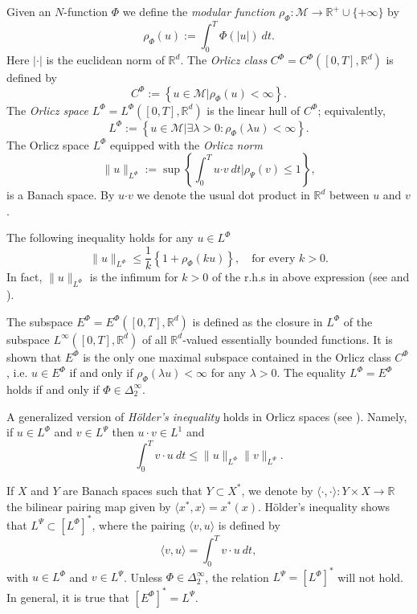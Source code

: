 \documentclass[twoside]{article}
\theoremstyle{remark}
\newcommand{\orlnor}{\|_{L^{\Phi}}}
\newcommand{\lphi}{L^{\Phi}}
\newcommand{\lpsi}{L^{\Psi}}
\newcommand{\ephi}{E^{\Phi}}
\newcommand{\claseor}{C^{\Phi}}
\renewcommand{\b}[1]{\boldsymbol{#1}}
\newcommand{\rr}{\mathbb{R}}
\renewcommand{\leq}{\leqslant}
\begin{document}
Given  an $N$-function $\Phi$ we define the \emph{modular function} 
$\rho_{\Phi}:\mathcal{M}\to \mathbb{R}^+\cup\{+\infty\}$ by
\[\rho_{\Phi}(u):= \int_0^T \Phi(|u|)\ dt.\]
Here $|\cdot|$ is the euclidean norm of $\mathbb{R}^d$.
The \emph{Orlicz class} $C^{\Phi}=C^{\Phi}([0,T],\rr^d)$  is defined  by
\begin{equation}\label{claseOrlicz}
  C^{\Phi}:=\left\{u\in \mathcal{M} | \rho_{\Phi}(u)< \infty \right\}.
\end{equation}
The \emph{Orlicz space} $\lphi=L^{\Phi}([0,T],\rr^d)$ is the linear hull of $\claseor$;
equivalently,
\begin{equation}\label{espacioOrlicz}
\lphi:=\left\{ u\in \mathcal{M}| \exists \lambda>0: \rho_{\Phi}(\lambda u) < \infty   \right\}.
\end{equation}
  The Orlicz space $\lphi$ equipped with the \emph{Orlicz norm}
\[
\|  u  \orlnor:=\sup \left\{  \int_0^T u\b{\cdot} v\ dt \big| \rho_{\Psi}(v)\leq 1\right\},
\]
is a Banach space. By $u\b{\cdot} v$ we denote the usual dot product in $\mathbb{R}^{d}$ between $u$ and $v$.

The following  inequality holds for any $u\in\lphi$
\begin{equation}\label{amemiya-ine}
\|u\orlnor\leq \frac{1}{k}\left\{1+\rho_{\Phi}(ku)\right\},\quad\text{for every } k>0.
\end{equation}
In fact, $\|u\orlnor$ is the infimum for $k>0$ of the r.h.s in above expression  (see \cite[Thm. 10.5]{KR} and \cite{hudzik2000amemiya}). 


The subspace $\ephi=\ephi([0,T],\rr^d)$ is defined as the closure in $\lphi$ of the subspace $L^{\infty}([0,T],\rr^d)$ of all $\mathbb{R}^d$-valued essentially bounded functions. It is shown that  $\ephi$ is the only one maximal subspace contained in the Orlicz class $\claseor$, i.e.
$u\in\ephi$ if and only if $\rho_{\Phi}(\lambda u)<\infty$ for any $\lambda>0$. The equality $\lphi=\ephi$ holds if and only if $\Phi\in\Delta_2^{\infty}$.

A generalized version of \emph{H\"older's inequality} holds in Orlicz spaces (see \cite[Thm. 9.3]{KR}). Namely, if $u\in\lphi$ and $v\in\lpsi$ then $u\cdot v\in L^1$ and
\begin{equation}\label{holder}
\int_0^Tv\cdot u\ dt\leq \|u\orlnor\|v\|_{L^{\Psi}}.
\end{equation}




If $X$ and $Y$ are  Banach spaces such that  $Y\subset X^*$, we denote by $\langle\cdot,\cdot\rangle:Y\times X\to\mathbb{R}$ the bilinear pairing  map given by $\langle x^*,x\rangle=x^*(x)$. H\"older's inequality shows that $\lpsi\subset \left[\lphi\right]^*$, where the pairing
$\langle v, u\rangle$
is defined by 
\begin{equation}\label{pairing}
  \langle v,u\rangle=\int_0^Tv\cdot u\ dt,
\end{equation}
with  $u\in\lphi$ and $v\in\lpsi$.
 Unless $\Phi \in \Delta_2^{\infty}$, the relation $\lpsi= \left[\lphi\right]^*$ will not hold. In general, it is true  that  $\left[\ephi\right]^*=\lpsi$.
\end{document}
